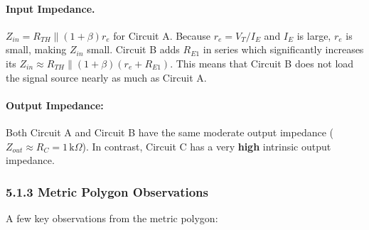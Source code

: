 \documentclass[11pt, a4paper]{article}
\begin{document}
\paragraph{Input Impedance.}
$Z_{in} = R_{TH} \| (1+\beta)r_e$ for Circuit A.
Because $r_e = V_T / I_E$ and $I_E$ is large, $r_e$ is small, making $Z_{in}$ small.
Circuit B adds $R_{E1}$ in series which significantly increases its $Z_{in} \approx R_{TH} \| (1+\beta)(r_e + R_{E1})$. This means that Circuit B does not load the signal source nearly as much as Circuit A.

\paragraph{Output Impedance:}
Both Circuit A and Circuit B have the same moderate output impedance ($Z_{out} \approx R_C = 1\,\text{k}\Omega$). In contrast, Circuit C has a very \textbf{high} intrinsic output impedance.

\subsubsection*{5.1.3 Metric Polygon Observations}
A few key observations from the metric polygon:
\end{document}
